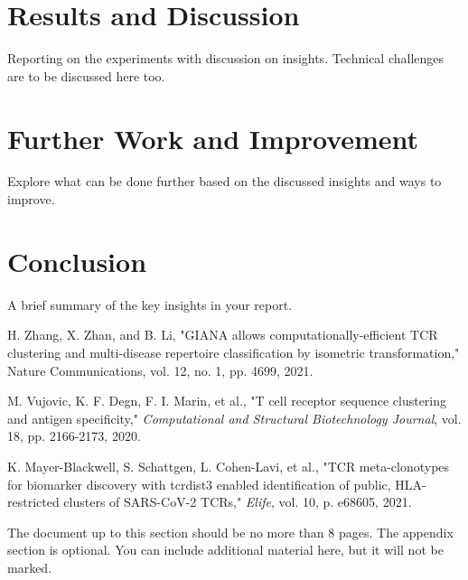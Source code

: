 \documentclass[conference]{IEEEtran}
\begin{document}
	
	\section{Results and Discussion}
	{\color{blue}Reporting on the experiments with discussion on insights. Technical challenges are to be discussed here too.}
	
	\section{Further Work and Improvement}
	{\color{blue}Explore what can be done further based on the discussed insights and ways to improve.}
	
	\section{Conclusion}
	{\color{blue}A brief summary of the key insights in your report.}
	
	\begin{thebibliography}{00}
		
		 H. Zhang, X. Zhan, and B. Li, "GIANA allows computationally-efficient TCR clustering and multi-disease repertoire classification by isometric transformation," Nature Communications, vol. 12, no. 1, pp. 4699, 2021.
		
		 M. Vujovic, K. F. Degn, F. I. Marin, et al., "T cell receptor sequence clustering and antigen specificity," \textit{Computational and Structural Biotechnology Journal}, vol. 18, pp. 2166-2173, 2020.
		
		 K. Mayer-Blackwell, S. Schattgen, L. Cohen-Lavi, et al., "TCR meta-clonotypes for biomarker discovery with tcrdist3 enabled identification of public, HLA-restricted clusters of SARS-CoV-2 TCRs," \textit{Elife}, vol. 10, p. e68605, 2021.
		
	\end{thebibliography}
	
	\appendix
	{\color{blue}The document up to this section should be no more than 8 pages. The appendix section is optional. You can include additional material here, but it will not be marked.}
	
\end{document}
